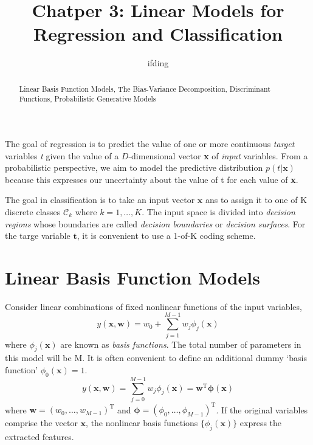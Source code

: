 \documentclass[5p,sort&compress]{elsarticle}
\begin{document}
\begin{frontmatter}
    \title{Chatper 3: Linear Models for Regression and Classification}
    \author{ifding}
    
    \begin{abstract}
        Linear Basis Function Models, The Bias-Variance Decomposition, Discriminant Functions, Probabilistic Generative Models
    \end{abstract}


\end{frontmatter}

The goal of regression is to predict the value of one or more continuous \textit{target} variables \textit{t} given the value of a $D$-dimensional vector \textbf{x} of \textit{input} variables. From a probabilistic perspective, we aim to model the predictive distribution $p(t|\mathbf{x})$ because this expresses our uncertainty about the value of t for each value of \textbf{x}.

The goal in classification is to take an input vector $\boldsymbol{x}$ ans to assign it to one of K discrete classes $\mathcal{C}_k$ where $k=1, \ldots, K$. The input space is divided into \textit{decision regions} whose boundaries are called \textit{decision boundaries} or \textit{decision surfaces}. For the targe variable $\boldsymbol{t}$, it is convenient to use a 1-of-K coding scheme.


\section{Linear Basis Function Models}

Consider linear combinations of fixed nonlinear functions of the input variables,
\begin{equation}
y(\mathbf{x}, \mathbf{w})=w_{0}+\sum_{j=1}^{M-1} w_{j} \phi_{j}(\mathbf{x})
\end{equation}
where $\phi_{j}(\mathbf{x})$ are known as \textit{basis functions}. The total number of parameters in this model will be M. It is often convenient to define an additional dummy `basis function' $\phi_{0}(\mathbf{x}) = 1$.
\begin{equation}
y(\mathbf{x}, \mathbf{w})=\sum_{j=0}^{M-1} w_{j} \phi_{j}(\mathbf{x})=\mathbf{w}^{\mathrm{T}} \boldsymbol{\phi}(\mathbf{x})
\end{equation}
where $\mathbf{w} = (w_0, \ldots, w_{M-1})^{\mathrm{T}}$ and $\boldsymbol{\phi} = (\phi_0, \ldots, \phi_{M-1})^{\mathrm{T}}$. If the original variables comprise the vector $\textbf{x}$, the nonlinear basis functions $\{\phi_{j}(\mathbf{x})\}$ express the extracted features.
\end{document}
